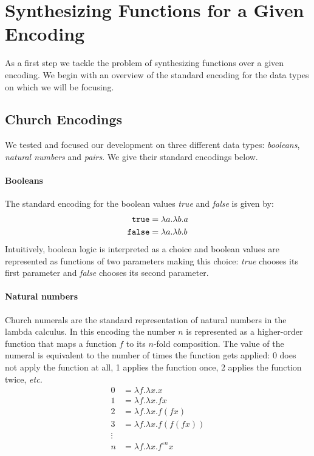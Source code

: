 \section{Synthesizing Functions for a Given Encoding}
%
As a first step we tackle the problem of synthesizing
functions over a given encoding.
%
We begin with an overview of the standard encoding for the
data types on which we will be focusing.


\subsection{Church Encodings}
%
We tested and focused our development on three
different data types: \emph{booleans}, \emph{natural
numbers} and \emph{pairs}.
%
We give their standard encodings below.

\paragraph{Booleans}
%
The standard encoding for the boolean values \emph{true} and
\emph{false} is given by:
%
\begin{align*}
  \text{\texttt{true}} &= \lambda a . \lambda b . a \\
  \text{\texttt{false}} &= \lambda a . \lambda b . b
\end{align*}
%
Intuitively, boolean logic is interpreted as a choice and
boolean values are represented as functions of two
parameters making this choice: \emph{true} chooses its first
parameter and \emph{false} chooses its second parameter.

\paragraph{Natural numbers}
%
Church numerals are the standard representation of natural
numbers in the lambda calculus.
%
In this encoding the number $n$ is represented as a
higher-order function that maps a function $f$ to its
$n$-fold composition.
%
The value of the numeral is equivalent to the number of
times the function gets applied: 0 does not apply the
function at all, 1 applies the function once, 2 applies the
function twice, \emph{etc.}
%
\begin{align*}
  0 & = \lambda f . \lambda x . x \\
  1 & = \lambda f . \lambda x . f x \\
  2 & = \lambda f . \lambda x . f (f x) \\
  3 & = \lambda f . \lambda x . f (f (f x)) \\
  \vdots & \\
  n & = \lambda f . \lambda x . f^{\circ n} x
\end{align*}

